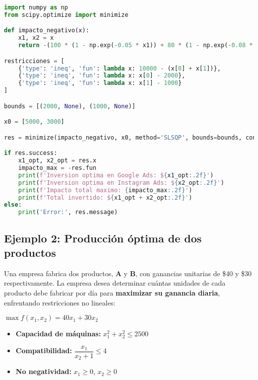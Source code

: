 \documentclass[12pt]{article}
\begin{document}
\begin{lstlisting}[language=Python]
import numpy as np
from scipy.optimize import minimize

def impacto_negativo(x):
    x1, x2 = x
    return -(100 * (1 - np.exp(-0.05 * x1)) + 80 * (1 - np.exp(-0.08 * x2)))

restricciones = [
    {'type': 'ineq', 'fun': lambda x: 10000 - (x[0] + x[1])},
    {'type': 'ineq', 'fun': lambda x: x[0] - 2000},
    {'type': 'ineq', 'fun': lambda x: x[1] - 1000}
]

bounds = [(2000, None), (1000, None)]

x0 = [5000, 3000]

res = minimize(impacto_negativo, x0, method='SLSQP', bounds=bounds, constraints=restricciones)

if res.success:
    x1_opt, x2_opt = res.x
    impacto_max = -res.fun
    print(f'Inversion optima en Google Ads: ${x1_opt:.2f}')
    print(f'Inversion optima en Instagram Ads: ${x2_opt:.2f}')
    print(f'Impacto total maximo: {impacto_max:.2f}')
    print(f'Total invertido: ${x1_opt + x2_opt:.2f}')
else:
    print('Error:', res.message)
\end{lstlisting}

\subsection{Ejemplo 2: Producción óptima de dos productos}

Una empresa fabrica dos productos, \textbf{A} y \textbf{B}, con ganancias unitarias de \$40 y \$30 respectivamente. La empresa desea determinar cuántas unidades de cada producto debe fabricar por día para \textbf{maximizar su ganancia diaria}, enfrentando restricciones no lineales:

\begin{center}
  $\displaystyle \max f(x_1, x_2) = 40x_1 + 30x_2$
  \end{center}

\begin{itemize}
    \item \textbf{Capacidad de máquinas:} $x_1^2 + x_2^2 \leq 2500$
    \item \textbf{Compatibilidad:} $\dfrac{x_1}{x_2 + 1} \leq 4$
    \item \textbf{No negatividad:} $x_1 \geq 0$, $x_2 \geq 0$
\end{itemize}

\vspace{0.3em}
\end{document}
